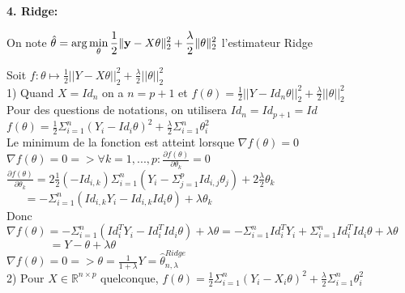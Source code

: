 \vspace{5mm}

{\fontsize{12pt}{22pt} \textbf{4. Ridge:}\par}

\vspace{5mm}

On note $\hat \theta = {\rm arg} \displaystyle\min_{\theta} \frac{1}{2}\| \mathbf{y} -X \theta \|_2^2+ \frac{\lambda}{2}\|\theta\|_2^2$ l’estimateur Ridge

Soit $f: \theta \mapsto \frac{1}{2}||Y-X\theta||_2^2+\frac{\lambda}{2}||\theta||_2^2$ \\

1) Quand $X=Id_n$ on a $n=p+1$ et $f(\theta)=\frac{1}{2}||Y-Id_n\theta||_2^2+\frac{\lambda}{2}||\theta||_2^2$ \\

Pour des questions de notations, on utilisera $Id_n=Id_{p+1}=Id$ \\

$f(\theta)=\frac{1}{2}\Sigma_{i=1}^n(Y_i-Id_i\theta)^2+\frac{\lambda}{2} \Sigma_{i=1}^n \theta_i^2$ \\

Le minimum de la fonction est atteint lorsque $\nabla f(\theta) = 0$ \\

$\nabla f(\theta) = 0 => \forall k=1,...,p: \frac{\partial f(\theta)}{\partial \theta_k}=0$ \\

$\frac{\partial f(\theta)}{\partial \theta_k}=2\frac{1}{2} (-Id_{i,k}) \Sigma_{i=1}^n (Y_i-\Sigma_{j=1}^pId_{i,j}\theta_j)+2\frac{\lambda}{2} \theta_k$ \\

$~~~~~~~=-\Sigma_{i=1}^n(Id_{i,k}Y_i-Id_{i,k}Id_i\theta)+\lambda \theta_k$ \\

Donc $\nabla f(\theta)=-\Sigma_{i=1}^n(Id_i^TY_i-Id_i^TId_i\theta)+\lambda \theta=-\Sigma_{i=1}^nId_i^TY_i+\Sigma_{i=1}^nId_i^TId_i \theta +\lambda \theta$ \\

$~~~~~~~~~~~~~~~~~=Y-\theta+\lambda \theta$ \\

$\nabla f(\theta) = 0 => \theta = \frac{1}{1+\lambda}Y= \hat{\theta}_{n,\lambda}^{Ridge} $\\


2) Pour $X \in \mathbb{R}^{n \times p}$ quelconque, $f(\theta)=\frac{1}{2}\Sigma_{i=1}^n(Y_i-X_i\theta)^2+\frac{\lambda}{2} \Sigma_{i=1}^n \theta_i^2$ \\

